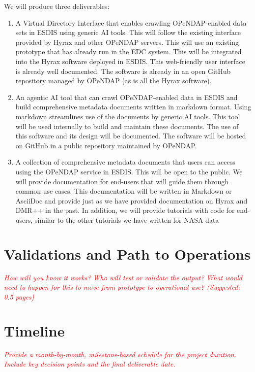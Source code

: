 \documentclass[11pt]{article}
\begin{document}
We will produce three deliverables:
\begin{enumerate}
    \item A Virtual Directory Interface that enables crawling \ac{OPeNDAP}-enabled data sets in \ac{ESDIS} using generic \ac{AI} tools. This will follow the existing interface provided by Hyrax and other \ac{OPeNDAP} servers. This will use an existing prototype that has already run in the \ac{EDC} system. This will be integrated into the Hyrax software deployed in \ac{ESDIS}. This web-friendly user interface is already well documented. The software is already in an open GitHub repository managed by \ac{OPeNDAP} (as is all the Hyrax software).

    \item An agentic \ac{AI} tool that can crawl \ac{OPeNDAP}-enabled data in \ac{ESDIS} and build comprehensive metadata documents written in markdown format. Using markdown streamlines use of the documents by generic \ac{AI} tools. This tool will be used internally to build and maintain these documents. The use of this software and its design will be documented. The software will be hosted on GitHub in a public repository maintained by \ac{OPeNDAP}.

    \item A collection of comprehensive metadata documents that users can access using the \ac{OPeNDAP} service in \ac{ESDIS}. This will be open to the public. We will provide documentation for end-users that will guide them through common use cases. This documentation will be written in Markdown or AsciiDoc and provide just as we have provided documentation on Hyrax and \ac{DMR++} in the past. In addition, we will provide tutorials with code for end-users, similar to the other tutorials we have written for \ac{NASA} data
\end{enumerate}

\section{Validations and Path to Operations}
\textcolor{red}{\textit{How will you know it works? Who will test or validate the output? What would need to happen for this to move from prototype to operational use? (Suggested: 0.5 pages)}}

\section{Timeline}
\textcolor{red}{\textit{Provide a month-by-month, milestone-based schedule for the project duration. Include key decision points and the final deliverable date.}}
\end{document}
